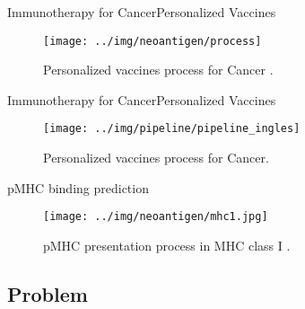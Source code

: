 \documentclass[10pt]{beamer}
\newcommand{\1}{
	\setbeamertemplate{background}{
		\texttt{[image: ../img/1]}
		\tikz[overlay] \fill[fill opacity=0.75,fill=white] (0,0) rectangle (-\paperwidth,\paperheight);
	}
}
\begin{document}
	
	\begin{frame}{Immunotherapy for Cancer}{Personalized Vaccines}	
		\begin{figure}
			\texttt{[image: ../img/neoantigen/process]}
			\caption{Personalized vaccines process for Cancer \cite{peng2019neoantigen}.}
		\end{figure}		
	\end{frame}
	
	\begin{frame}{Immunotherapy for Cancer}{Personalized Vaccines}	
		\begin{figure}
			\texttt{[image: ../img/pipeline/pipeline\_ingles]}
			\caption{Personalized vaccines process for Cancer.}
		\end{figure}		
	\end{frame}
	
	
	
	\begin{frame}{pMHC binding prediction}{}		
		\begin{figure}[H]
			\centering
			\texttt{[image: ../img/neoantigen/mhc1.jpg]}
			\caption{pMHC presentation process in MHC class I \cite{zhang2019application}.}
			\label{fig:mhc1}
		\end{figure}	
	\end{frame}
	
	\subsection{Problem}
	
\end{document}
